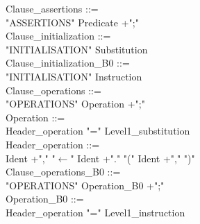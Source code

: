 \documentclass[12pt,a4paper,draft]{report}
\begin{document}
{\begin{sloppypar}
Clause\_assertions ::= \\
  "ASSERTIONS" Predicate +";"\\
Clause\_initialization ::= \\
  "INITIALISATION" Substitution\\
Clause\_initialization\_B0 ::= \\
  "INITIALISATION" Instruction\\
Clause\_operations ::= \\
  "OPERATIONS"  Operation +";"\\
Operation ::= \\
   Header\_operation  "="  Level1\_substitution\\
   
\noindent Header\_operation ::= \\
  Ident +","  "$\leftarrow$"   Ident +"."   "(" Ident +"," ")"  \\  %
Clause\_operations\_B0 ::= \\
  "OPERATIONS"  Operation\_B0 +";"\\
Operation\_B0 ::= \\
   Header\_operation  "="  Level1\_instruction\\
   

\end{sloppypar}}
\end{document}
